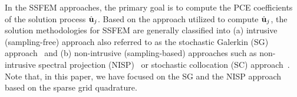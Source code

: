 \documentclass[letter,1p,11pt,oneside,onecolumn,sort&compress]{elsarticle}
\begin{document}



In the SSFEM approaches, the primary goal is to compute the PCE coefficients of the solution process ${\hat{\bf{u}}}_{j}$.
Based on the approach utilized to compute ${\hat{\bf{u}}}_{j}$, the solution methodologies for SSFEM are generally classified into (a) intrusive (sampling-free) approach also referred to as the stochastic Galerkin (SG) approach~\cite{ghanemSFEM1991,ghanem1996numerical,pellissetti2000iterative,sarkarIJNME2009,ullmann2012efficient} and (b) non-intrusive (sampling-based) approaches such as non-intrusive spectral projection (NISP)~\cite{le2010spectral,reagana2003uncertainty,hosder2006non,eldred2009comparison,desai2010analysis} or stochastic collocation (SC) approach~\cite{babuvska2007stochastic,xiu2007efficient,ganapathysubramanian2007sparse,nobile2008sparse}.
Note that, in this paper, we have focused on the SG and the NISP approach based on the sparse grid quadrature.
\end{document}
